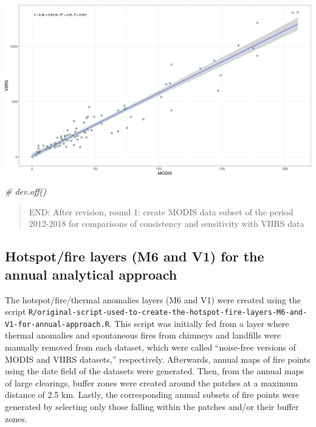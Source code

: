 \documentclass[10pt,landscape,a3paper]{article}
\newenvironment{Shaded}{\begin{snugshade}}{\end{snugshade}}
\newcommand{\CommentTok}[1]{\textcolor[rgb]{0.56,0.35,0.01}{\textit{#1}}}
\begin{document}
\begin{center}\includegraphics[width=0.75\linewidth]{img/data-download-preparation-eda/unnamed-chunk-1-9} \end{center}

\begin{Shaded}
\begin{Highlighting}[]
\CommentTok{\# dev.off()}
\end{Highlighting}
\end{Shaded}

\begin{quote}
END: After revision, round 1: create MODIS data subset of the period
2012-2018 for comparisons of consistency and sensitivity with VIIRS data
\end{quote}

\hypertarget{hotspotfire-layers-m6-and-v1-for-the-annual-analytical-approach}{%
\subsection{Hotspot/fire layers (M6 and V1) for the annual analytical
approach}\label{hotspotfire-layers-m6-and-v1-for-the-annual-analytical-approach}}

The hotspot/fire/thermal anomalies layers (M6 and V1) were created using
the script
\texttt{R/original-script-used-to-create-the-hotspot-fire-layers-M6-and-V1-for-annual-approach.R}.
This script was initially fed from a layer where thermal anomalies and
spontaneous fires from chimneys and landfills were manually removed from
each dataset, which were called ``noise-free versions of MODIS and VIIRS
datasets,'' respectively. Afterwards, annual maps of fire points using
the date field of the datasets were generated. Then, from the annual
maps of large clearings, buffer zones were created around the patches at
a maximum distance of 2.5 km. Lastly, the corresponding annual subsets
of fire points were generated by selecting only those falling within the
patches and/or their buffer zones.
\end{document}
